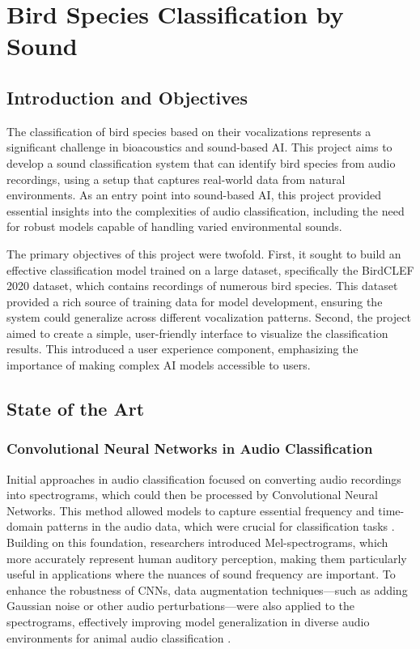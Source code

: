 \section{Bird Species Classification by Sound}

\subsection{Introduction and Objectives}
The classification of bird species based on their vocalizations represents a significant challenge in bioacoustics and sound-based AI. This project aims to develop a sound classification system that can identify bird species from audio recordings, using a setup that captures real-world data from natural environments. As an entry point into sound-based AI, this project provided essential insights into the complexities of audio classification, including the need for robust models capable of handling varied environmental sounds.

The primary objectives of this project were twofold. First, it sought to build an effective classification model trained on a large dataset, specifically the BirdCLEF 2020 dataset, which contains recordings of numerous bird species. This dataset provided a rich source of training data for model development, ensuring the system could generalize across different vocalization patterns. Second, the project aimed to create a simple, user-friendly interface to visualize the classification results. This introduced a user experience component, emphasizing the importance of making complex AI models accessible to users.

\subsection{State of the Art}

\subsubsection{Convolutional Neural Networks in Audio Classification}

Initial approaches in audio classification focused on converting audio recordings into spectrograms, which could then be processed by Convolutional Neural Networks. This method allowed models to capture essential frequency and time-domain patterns in the audio data, which were crucial for classification tasks \cite{zaman2023survey}. Building on this foundation, researchers introduced Mel-spectrograms, which more accurately represent human auditory perception, making them particularly useful in applications where the nuances of sound frequency are important. To enhance the robustness of CNNs, data augmentation techniques—such as adding Gaussian noise or other audio perturbations—were also applied to the spectrograms, effectively improving model generalization in diverse audio environments for animal audio classification \cite{nanni2020data}\cite{sampathkumar2022tuc}.

